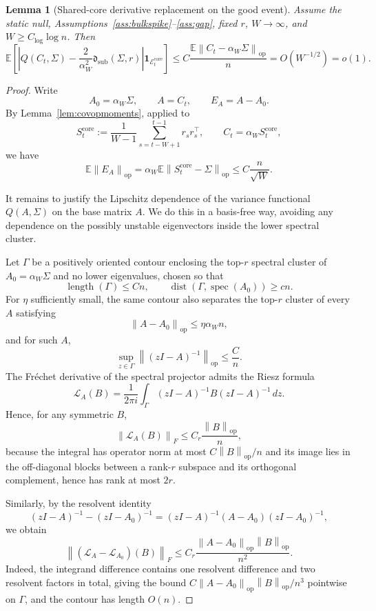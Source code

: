 \documentclass[11pt]{article}
\theoremstyle{tightplain}
\newtheorem{lemma}[theorem]{Lemma}
\theoremstyle{tightdef}
\DeclareMathOperator{\op}{op}
\newcommand{\E}{\mathbb E}
\newcommand{\norm}[1]{\left\lVert #1 \right\rVert}
\newcommand{\one}{\mathbf 1}
\newcommand{\dsub}{\mathfrak d_{\mathrm{sub}}}
\begin{document}
\begin{lemma}[Shared-core derivative replacement on the good event]
\label{lem:corederivativeproved}
Assume the static null, Assumptions~\ref{ass:bulkspike}--\ref{ass:gap}, fixed
$r$, $W\to\infty$, and $W\ge C_{\log}\log n$. Then
\[
\E\left[
\left|
Q(C_t,\Sigma)
-\frac{2}{\alpha_W^2}\dsub(\Sigma,r)
\right|
\one_{\mathcal E_t^{\mathrm{core}}}
\right]
\le
C\frac{\E\norm{C_t-\alpha_W\Sigma}_{\op}}{n}
= O(W^{-1/2})
=o(1).
\]
\end{lemma}

\begin{proof}
Write
\[
A_0=\alpha_W\Sigma,
\qquad
A=C_t,
\qquad
E_A=A-A_0.
\]
By Lemma~\ref{lem:covopmoments}, applied to
\[
S_t^{\mathrm{core}}
:=\frac1{W-1}\sum_{s=t-W+1}^{t-1}r_s r_s^\top,
\qquad
C_t=\alpha_W S_t^{\mathrm{core}},
\]
we have
\[
\E\norm{E_A}_{\op}
=\alpha_W\E\norm{S_t^{\mathrm{core}}-\Sigma}_{\op}
\le
C\frac n{\sqrt W}.
\]

It remains to justify the Lipschitz dependence of the variance functional
$Q(A,\Sigma)$ on the base matrix $A$. We do this in a basis-free way, avoiding
any dependence on the possibly unstable eigenvectors inside the lower spectral
cluster.

Let $\Gamma$ be a positively oriented contour enclosing the top-$r$ spectral
cluster of $A_0=\alpha_W\Sigma$ and no lower eigenvalues, chosen so that
\[
\operatorname{length}(\Gamma)\le Cn,
\qquad
\operatorname{dist}(\Gamma,\operatorname{spec}(A_0))\ge cn .
\]
For $\eta$ sufficiently small, the same contour also separates the top-$r$
cluster of every $A$ satisfying
\[
\norm{A-A_0}_{\op}\le \eta\alpha_W n,
\]
and for such $A$,
\[
\sup_{z\in\Gamma}\norm{(zI-A)^{-1}}_{\op}\le \frac Cn .
\]
The Fr\'echet derivative of the spectral projector admits the Riesz formula
\[
\mathcal L_A(B)
=\frac1{2\pi i}\int_\Gamma
(zI-A)^{-1}B(zI-A)^{-1}\,dz .
\]
Hence, for any symmetric $B$,
\[
\norm{\mathcal L_A(B)}_F
\le
C_r\frac{\norm B_{\op}}n,
\]
because the integral has operator norm at most
$C\norm B_{\op}/n$ and its image lies in the off-diagonal blocks between a
rank-$r$ subspace and its orthogonal complement, hence has rank at most $2r$.

Similarly, by the resolvent identity
\[
(zI-A)^{-1}-(zI-A_0)^{-1}
=(zI-A)^{-1}(A-A_0)(zI-A_0)^{-1},
\]
we obtain
\[
\norm{(\mathcal L_A-\mathcal L_{A_0})(B)}_F
\le
C_r\frac{\norm{A-A_0}_{\op}\norm B_{\op}}{n^2}.
\]
Indeed, the integrand difference contains one resolvent difference and two
resolvent factors in total, giving the bound
$C\norm{A-A_0}_{\op}\norm B_{\op}/n^3$ pointwise on $\Gamma$, and the contour
has length $O(n)$.


\end{proof}
\end{document}
